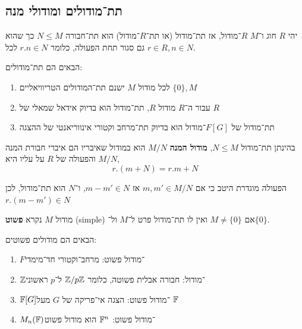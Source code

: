 \subsection{תת־מודולים ומודולי מנה}
\begin{definition}[תת־מודול]
	יהי $R$ חוג ו־$M$ $R$־מודול, אז תת־מודול (או תת־$R$־מודול) הוא תת־חבורה $N \le M$ כך שהוא גם סגור תחת הפעולה, כלומר $r . n \in N$ לכל $r \in R, n \in N$.
\end{definition}
\begin{example}
	הבאים הם תת־מודולים:
	\begin{enumerate}
		\item לכל מודול $M$ ישנם תת־המודולים הטריוויאליים $\{ 0 \}, M$
		\item עבור ה־$R$ מודול $R$, תת־מודול הוא בדיוק אידאל שמאלי של $R$
		\item תת־מודול של $F[G]$־מודול הוא בדיוק תת־מרחב וקטורי אינווריאנטי של ההצגה
	\end{enumerate}
\end{example}
\begin{definition}
	בהינתן תת־מודול $N \le M$, \textbf{מודול המנה} $M / N$ הוא במודול שאיבריו הם איברי חבורת המנה $M / N$ והפעולה של $R$ על עליו היא,
	\[
		r . (m + N)
		= r . m + N
	\]
\end{definition}
\begin{remark}
	הפעולה מוגדרת היטב כי אם $m, m' \in M / N$ אז $m - m' \in N$, ו־$N$ הוא תת־מודול, לכן $r . (m - m') \in N$
\end{remark}
\begin{definition}
	מודול $M$ נקרא \textbf{פשוט} (simple) אם $M \ne \{ 0 \}$ ואין לו תת־מודול פרט ל־$M$ ול־$\{ 0 \}$.
\end{definition}
\begin{example}
	הבאים הם מודולים פשוטים:
	\begin{enumerate}
		\item $F$־מודול פשוט: מרחב־וקטורי חד־מימדי
		\item $\mathbb{Z}$־מודול: חבורה אבלית פשוטה, כלומר $\mathbb{Z} / p \mathbb{Z}$ ל־$p$ ראשוני
		\item $\mathbb{F}[G]$־מודול פשוט: הצגה אי־פריקה של $G$ מעל $\mathbb{F}$
		\item $M_n(\mathbb{F})$־מודול פשוט: $\mathbb{F}^n$ הוא מודול פשוט
	\end{enumerate}
\end{example}

